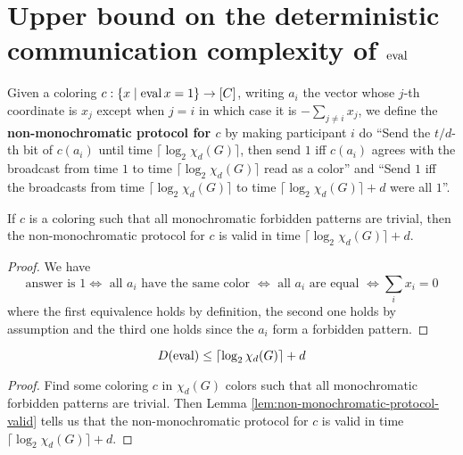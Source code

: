 \chapter{Upper bound on the deterministic communication complexity of \texorpdfstring{$\operatorname{eval}$}{eval}}

\begin{definition}
  \label{def:non-monochromatic-protocol}

  Given a coloring $c : \{x \mid \operatorname{eval} x = 1\} \to [C]$, writing $a_i$ the vector whose $j$-th coordinate is $x_j$ except when $j = i$ in which case it is $-\sum_{j \ne i} x_j$, we define the {\bf non-monochromatic protocol for $c$} by making participant $i$ do ``Send the $t / d$-th bit of $c(a_i)$ until time $\lceil\log_2\chi_d(G)\rceil$, then send $1$ iff $c(a_i)$ agrees with the broadcast from time $1$ to time $\lceil\log_2\chi_d(G)\rceil$ read as a color'' and ``Send $1$ iff the broadcasts from time $\lceil\log_2\chi_d(G)\rceil$ to time $\lceil\log_2\chi_d(G)\rceil + d$ were all $1$''.
\end{definition}

\begin{lemma}
  \label{lem:non-monochromatic-protocol-valid}

  If $c$ is a coloring such that all monochromatic forbidden patterns are trivial, then the non-monochromatic protocol for $c$ is valid in time $\lceil\log_2\chi_d(G)\rceil + d$.
\end{lemma}
\begin{proof}
  \uses{}

  We have
  $$\text{answer is } 1 \iff \text{ all $a_i$ have the same color } \iff \text{ all $a_i$ are equal } \iff \sum_i x_i = 0$$
  where the first equivalence holds by definition, the second one holds by assumption and the third one holds since the $a_i$ form a forbidden pattern.
\end{proof}

\begin{theorem}
  \label{thm:complexity-eval-corner-color-color}

  $$D(\operatorname{eval}) \le \lceil\log_2\chi_d(G)\rceil + d$$
\end{theorem}
\begin{proof}

  Find some coloring $c$ in $\chi_d(G)$ colors such that all monochromatic forbidden patterns are trivial. Then Lemma \ref{lem:non-monochromatic-protocol-valid} tells us that the non-monochromatic protocol for $c$ is valid in time $\lceil\log_2\chi_d(G)\rceil + d$.
\end{proof}

